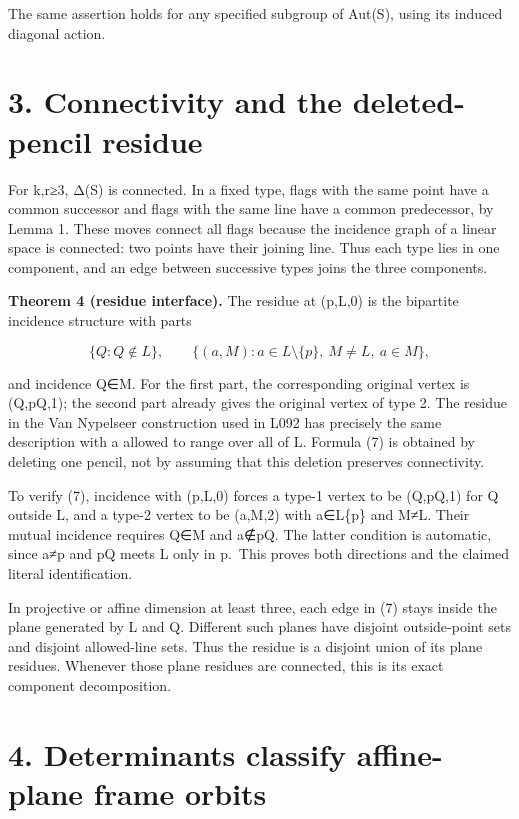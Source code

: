 The same assertion holds for any specified subgroup of Aut(S), using its
induced diagonal action.

\section{3. Connectivity and the deleted-pencil
residue}\label{connectivity-and-the-deleted-pencil-residue}

For k,r≥3, Δ(S) is connected. In a fixed type, flags with the same point
have a common successor and flags with the same line have a common
predecessor, by Lemma 1. These moves connect all flags because the
incidence graph of a linear space is connected: two points have their
joining line. Thus each type lies in one component, and an edge between
successive types joins the three components.

\textbf{Theorem 4 (residue interface).} The residue at (p,L,0) is the
bipartite incidence structure with parts

\[
 \{Q:Q\notin L\},\qquad
 \{(a,M):a\in L\setminus\{p\},\ M\ne L,\ a\in M\},
\tag{7}
\]

and incidence Q∈M. For the first part, the corresponding original vertex
is (Q,pQ,1); the second part already gives the original vertex of type
2. The residue in the Van Nypelseer construction used in L092 has
precisely the same description with a allowed to range over all of L.
Formula (7) is obtained by deleting one pencil, not by assuming that
this deletion preserves connectivity.

To verify (7), incidence with (p,L,0) forces a type-1 vertex to be
(Q,pQ,1) for Q outside L, and a type-2 vertex to be (a,M,2) with
a∈L\{p\} and M≠L. Their mutual incidence requires Q∈M and a∉pQ. The
latter condition is automatic, since a≠p and pQ meets L only in p.~This
proves both directions and the claimed literal identification.

In projective or affine dimension at least three, each edge in (7) stays
inside the plane generated by L and Q. Different such planes have
disjoint outside-point sets and disjoint allowed-line sets. Thus the
residue is a disjoint union of its plane residues. Whenever those plane
residues are connected, this is its exact component decomposition.

\section{4. Determinants classify affine-plane frame
orbits}\label{determinants-classify-affine-plane-frame-orbits}

